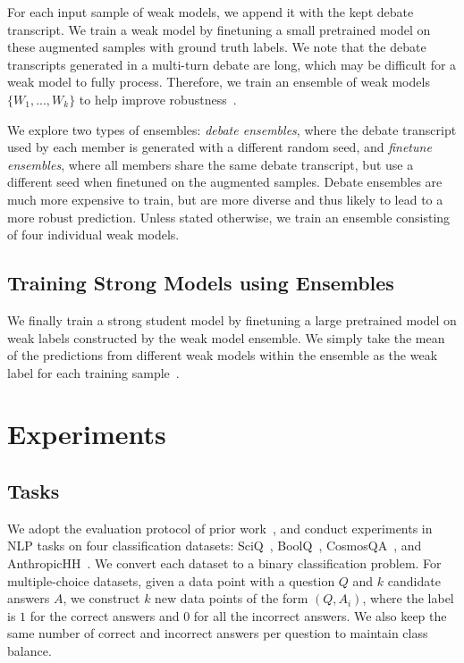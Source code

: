 \documentclass[letterpaper]{article} %
\begin{document}
For each input sample of weak models, we append it with the kept debate transcript.
We train a weak model by finetuning a small pretrained model on these augmented samples with ground truth labels.
We note that the debate transcripts generated in a multi-turn debate are long, which may be difficult for a weak model to fully process.
Therefore, we train an ensemble of weak models $\{W_1,...,W_k\}$ to help improve robustness~\cite{lakshminarayanan2017simple}.

We explore two types of ensembles: \textit{debate ensembles}, where the debate transcript used by each member is generated with a different random seed, and \textit{finetune ensembles}, where all members share the same debate transcript, but use a different seed when finetuned on the augmented samples.
Debate ensembles are much more expensive to train, but are more diverse and thus likely to lead to a more robust prediction.
Unless stated otherwise, we train an ensemble consisting of four individual weak models.

\subsection{Training Strong Models using Ensembles}

We finally train a strong student model by finetuning a large pretrained model on weak labels constructed by the weak model ensemble.
We simply take the mean of the predictions from different weak models within the ensemble as the weak label for each training sample~\cite{ganaie2022ensemble}.

\section{Experiments}

\subsection{Tasks}

We adopt the evaluation protocol of prior work~\cite{burns2023weak}, and conduct experiments in NLP tasks on four classification datasets: SciQ~\cite{welbl2017crowdsourcing}, BoolQ~\cite{clark2019boolq}, CosmosQA~\cite{huang2019cosmos}, and AnthropicHH~\cite{bai2022training}.
We convert each dataset to a binary classification problem.
For multiple-choice datasets, given a data point with a question $Q$ and $k$ candidate answers $A$, we construct $k$ new data points of the form $(Q, A_i)$, where the label is $1$ for the correct
answers and $0$ for all the incorrect answers.
We also keep the same number of correct and incorrect answers per question to maintain class balance.
\end{document}
